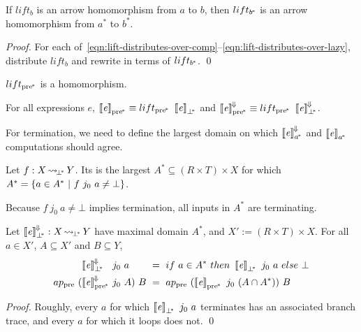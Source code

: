 \documentclass{llncs}
\newcommand{\arrow}{\rightsquigarrow}
\newcommand{\conv}{^{\mspace{-2mu}\Downarrow\mspace{-2mu}}}
\newcommand{\meaningofconv}[1]{\left\llbracket{#1}\right\rrbracket\conv}
\newcommand{\genb}{_b}
\newcommand{\genc}{_{a^{\mspace{-2mu}*}}}
\newcommand{\gend}{_{b^{\mspace{-2mu}*}}}
\newcommand{\pbot}{{\bot^{\mspace{-4mu}*}}}
\newcommand{\pre}{_\mathrm{pre}}
\newcommand{\ppre}{_\mathrm{pre^{\mspace{-2mu}*}}}
\DeclareMathOperator{\pbotto}{{\arrow\mspace{-3mu}}_\pbot}
\begin{document}
\begin{theorem}
If $lift\genb$ is an arrow homomorphism from $a$ to $b$, then $lift\gend$ is an arrow homomorphism from $a^*$ to $b^*$.
\end{theorem}
\begin{proof}
For each of~\eqref{eqn:lift-distributes-over-comp}--\eqref{eqn:lift-distributes-over-lazy}, distribute $lift\genb$ and rewrite in terms of $lift\gend$.
\qed
\end{proof}

\begin{corollary}
$lift\ppre$ is a homomorphism.
\end{corollary}

\begin{corollary}
For all expressions $\mathit{e}$, $\meaningof{\mathit{e}}\ppre \equiv lift\ppre~\meaningof{\mathit{e}}_\pbot$ and $\meaningofconv{\mathit{e}}\ppre \equiv lift\ppre~\meaningofconv{\mathit{e}}_\pbot$.
\end{corollary}

For termination, we need to define the largest domain on which $\meaningofconv{\mathit{e}}\genc$ and $\meaningof{\mathit{e}}\genc$ computations should agree.

\begin{definition}
\label{def:maximal-domain}
Let $f : X \pbotto Y$.
Its  is the largest $A^* \subseteq (R \times T) \times X$ for which $A^* = \lbrace {a \in A^*} \ \lvert\ {f~j_0~a \neq \bot} \rbrace$.
\end{definition}

Because $f~j_0~a \neq \bot$ implies termination, all inputs in $A^*$ are terminating.

\begin{theorem}
\label{thm:correct-convergence}
Let $\meaningofconv{\mathit{e}}_\pbot : X \pbotto Y$ have maximal domain $A^*$, and $X' := (R \times T) \times X$.
For all $a \in X'$, $A \subseteq X'$ and $B \subseteq Y$,
\begin{equation}
\begin{aligned}
	&\meaningofconv{\mathit{e}}_\pbot &&\!\!\!\!j_0~a &&\!\!\!\!= \ if~a \in A^*~then~\meaningof{\mathit{e}}_\pbot~j_0~a~else~\bot \\
	ap\pre~(\!&\meaningofconv{\mathit{e}}\ppre &&\!\!\!\!j_0~A)~B &&\!\!\!\!= \ ap\pre~(\meaningof{\mathit{e}}\ppre~j_0~(A \i A^*))~B
\end{aligned}
\end{equation}
\end{theorem}
\begin{proof}
Roughly, every $a$ for which $\meaningof{\mathit{e}}_\pbot~j_0~a$ terminates has an associated branch trace, and every $a$ for which it loops does not.
\qed
\end{proof}
\end{document}
